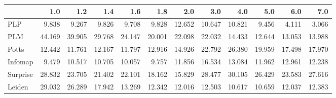 \begin{tabular}{lrrrrrrrrrrr}
\toprule
{} &    1.0 &    1.2 &    1.4 &    1.6 &    1.8 &    2.0 &    3.0 &    4.0 &    5.0 &    6.0 &    7.0 \\
\midrule
PLP      &  9.838 &  9.267 &  9.826 &  9.708 &  9.828 & 12.652 & 10.647 & 10.821 &  9.456 &  4.111 &  3.066 \\
PLM      & 44.169 & 39.905 & 29.768 & 24.147 & 20.001 & 22.098 & 22.032 & 14.433 & 12.644 & 13.053 & 13.988 \\
Potts    & 12.442 & 11.761 & 12.167 & 11.797 & 12.916 & 14.926 & 22.792 & 26.380 & 19.959 & 17.498 & 17.970 \\
Infomap  &  9.479 & 10.517 & 10.705 & 10.057 &  9.757 & 11.856 & 16.534 & 13.084 & 11.962 & 12.961 & 12.238 \\
Surprise & 28.832 & 23.705 & 21.402 & 22.101 & 18.162 & 15.829 & 28.477 & 30.105 & 26.429 & 23.583 & 27.616 \\
Leiden   & 29.032 & 26.289 & 17.942 & 13.269 & 12.342 & 12.016 & 12.503 & 10.617 & 10.659 & 12.037 & 12.383 \\
\bottomrule
\end{tabular}
